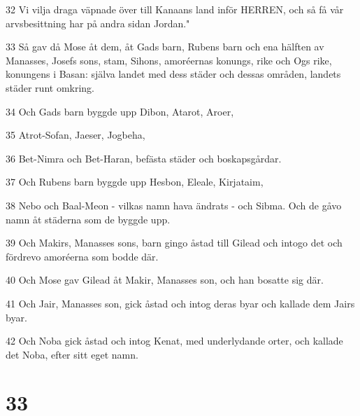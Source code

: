 \par 32 Vi vilja draga väpnade över till Kanaans land inför HERREN, och så få vår arvsbesittning har på andra sidan Jordan."
\par 33 Så gav då Mose åt dem, åt Gads barn, Rubens barn och ena hälften av Manasses, Josefs sons, stam, Sihons, amoréernas konungs, rike och Ogs rike, konungens i Basan: själva landet med dess städer och dessas områden, landets städer runt omkring.
\par 34 Och Gads barn byggde upp Dibon, Atarot, Aroer,
\par 35 Atrot-Sofan, Jaeser, Jogbeha,
\par 36 Bet-Nimra och Bet-Haran, befästa städer och boskapsgårdar.
\par 37 Och Rubens barn byggde upp Hesbon, Eleale, Kirjataim,
\par 38 Nebo och Baal-Meon - vilkas namn hava ändrats - och Sibma. Och de gåvo namn åt städerna som de byggde upp.
\par 39 Och Makirs, Manasses sons, barn gingo åstad till Gilead och intogo det och fördrevo amoréerna som bodde där.
\par 40 Och Mose gav Gilead åt Makir, Manasses son, och han bosatte sig där.
\par 41 Och Jair, Manasses son, gick åstad och intog deras byar och kallade dem Jairs byar.
\par 42 Och Noba gick åstad och intog Kenat, med underlydande orter, och kallade det Noba, efter sitt eget namn.

\chapter{33}

